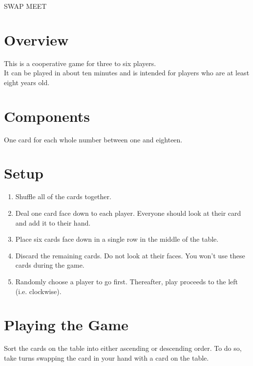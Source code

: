 \documentclass[a6paper, parskip=half, DIV=14, 10pt]{scrartcl}
\begin{document}
\setmainfont{Roboto}%
\raggedright%

\begin{center}
{
\setmainfont[Scale=1.58]{Roboto Slab-Bold}
\Huge
SWAP MEET
}
\end{center}

\section*{Overview}
This is a cooperative game for three to six players.\\It can be played in about ten minutes and is intended for players who are at least eight years old.

\section*{Components}
\begin{description}[leftmargin=0pt, labelsep=\widthof{\ }]
	\item[Numbered Cards (18) \textendash] One card for each whole number between one and eighteen.
\end{description}

\section*{Setup}
\begin{enumerate}[leftmargin=*]
	\item Shuffle all of the cards together. 
	\item Deal one card face down to each player. Everyone should look at their card and add it to their hand. 
	\item Place six cards face down in a single row in the middle of the table. 
	\item Discard the remaining cards. Do not look at their faces. You won't use these cards during the game.
	\item Randomly choose a player to go first. Thereafter, play proceeds to the left (i.e. clockwise).
\end{enumerate}

\newpage

\section*{Playing the Game}
Sort the cards on the table into either ascending or descending order.
To do so, take turns swapping the card in your hand with a card on the table.
\end{document}
